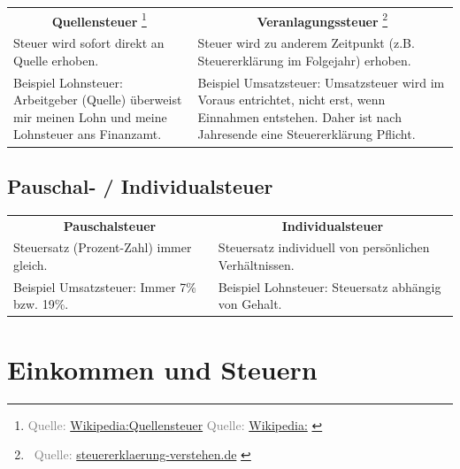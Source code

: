 \documentclass{beamer}
\let\oldfootnote\footnote
\renewcommand{\footnote}[1]
{%
	\oldfootnote
	{
		\tiny
		\textcolor{gray}{#1}
	}%
}
\newcommand{\citewiki}[2][]
{%
	\footnote
	{
		\ifthenelse{\isempty{#1}}
		{
			Quelle: \href{https://de.wikipedia.org/wiki/#2}{Wikipedia:#2}
		}
		{
			Quelle: \href{https://de.wikipedia.org/wiki/#2}{Wikipedia:#1}
		}
	}
}
\newcommand{\citeurl}[2]
{%
	\footnote{\ Quelle: \href{#1}{#2}}
}
\begin{document}
			\begin{frame}
				\begin{tabularx}{\linewidth}{X|X}
					\multicolumn{1}{c|}{\textbf{Quellensteuer}\citewiki{Quellensteuer}} &
					\multicolumn{1}{c}{\textbf{Veranlagungssteuer}\citeurl{https://www.steuererklaerung-verstehen.de/lexikon/veranlagungssteuer}{steuererklaerung-verstehen.de}} \\[0.25cm]
					Steuer wird sofort direkt an Quelle erhoben. & Steuer wird zu anderem Zeitpunkt (z.B. Steuererklärung im Folgejahr) erhoben.\\
					\vspace{0.25cm} Beispiel Lohnsteuer:\newline
						Arbeitgeber (Quelle) überweist mir meinen Lohn und meine Lohnsteuer ans Finanzamt. &
					\vspace{0.25cm} Beispiel Umsatzsteuer:\newline
						Umsatzsteuer wird im Voraus entrichtet, nicht erst, wenn Einnahmen entstehen. Daher ist nach Jahresende eine Steuererklärung Pflicht.
				\end{tabularx}
			\end{frame}
		
		\subsection{Pauschal- / Individualsteuer}
		
			\begin{frame}
				\begin{tabularx}{\linewidth}{X|X}
					\multicolumn{1}{c|}{\textbf{Pauschalsteuer}} &
					\multicolumn{1}{c}{\textbf{Individualsteuer}} \\[0.25cm]
					Steuersatz (Prozent-Zahl) immer gleich. & Steuersatz individuell von persönlichen Verhältnissen.\\
					\vspace{0.25cm} Beispiel Umsatzsteuer:\newline
						Immer 7\% bzw. 19\%. &
					\vspace{0.25cm} Beispiel Lohnsteuer:\newline
						Steuersatz abhängig von Gehalt.
				\end{tabularx}
			\end{frame}
	
	\section{Einkommen und Steuern}
	
\end{document}
